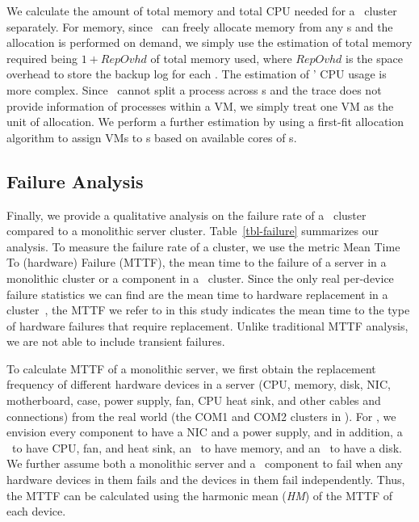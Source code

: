 We calculate the amount of total memory and total CPU needed for a \lego\ cluster separately.
For memory, since \lego\ can freely allocate memory from any \mcomponent{}s and the allocation is performed on demand, 
we simply use the estimation of total memory required being {\small{$1+RepOvhd$}} of total memory used,
where {\small{$RepOvhd$}} is the space overhead to store the backup log for each \mcomponent.
The estimation of \lego' CPU usage is more complex.
Since \lego\ cannot split a process across \pcomponent{}s and the trace does not provide information of 
processes within a VM, we simply treat one VM as the unit of allocation.
We perform a further estimation by using a first-fit allocation algorithm to assign VMs to \pcomponent{}s 
based on available cores of \pcomponent{}s.

\fi


\subsection{Failure Analysis}
\label{sec:lego:failure-results}
Finally, we provide a qualitative analysis on the failure rate of a \lego\ cluster compared to a monolithic server cluster.
Table~\ref{tbl-failure} summarizes our analysis.
To measure the failure rate of a cluster, we use the metric Mean Time To (hardware) Failure (MTTF), 
the mean time to the failure of a server in a monolithic cluster
or a component in a \lego\ cluster.
Since the only real per-device failure statistics we can find are
the mean time to hardware replacement in a cluster~\cite{Failure-Disk-FAST07},
the MTTF we refer to in this study indicates the mean time to the type of 
hardware failures that require replacement.
Unlike traditional MTTF analysis, we are not able to include transient failures.

To calculate MTTF of a monolithic server, we first obtain the replacement frequency of different hardware devices in a server
(CPU, memory, disk, NIC, motherboard, case, power supply, fan, CPU heat sink, and other cables and connections)
from the real world (the COM1 and COM2 clusters in \cite{Failure-Disk-FAST07}).
For \lego, we envision every component to have a NIC and a power supply, 
and in addition, a \pcomponent\ to have CPU, fan, and heat sink, an \mcomponent\ to have memory, and an \scomponent\ to have a disk.
We further assume both a monolithic server and a \lego\ component to fail when any hardware devices in them fails
and the devices in them fail independently.
Thus, the MTTF can be calculated using the harmonic mean ({\em HM}) 
of the MTTF of each device.

